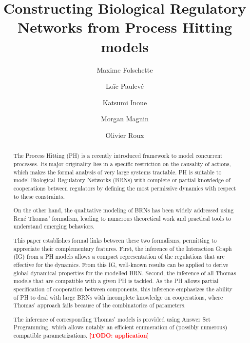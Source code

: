 \documentclass[preprint]{elsarticle}
\newcommand{\rewriteng}[1]{\textcolor{blue}{#1}}
\newcommand{\rewriteil}[1]{\rewriteng{\textbf{[#1]}}}
\newcommand{\todo}[1]{\textcolor{red}{\textbf{[TODO: #1]}}}
\begin{document}
\begin{frontmatter}

\title{Constructing Biological Regulatory Networks from Process Hitting models}

\author[irccyn,nii]{Maxime Folschette}
\author[eth]{Lo\"ic Paulev\'e}
\author[nii]{Katsumi Inoue}
\author[irccyn,nii]{Morgan Magnin}
\author[irccyn]{Olivier Roux}

\address[irccyn]{LUNAM Universit\'e, \'Ecole Centrale de Nantes, IRCCyN UMR CNRS 6597\\
(Institut de Recherche en Communications et Cybern\'etique de Nantes)\\
1 rue de la No\"e - B.P. 92101 - 44321 Nantes Cedex 3, France.}
\address[nii]{National Institute of Informatics,\\
2-1-2, Hitotsubashi, Chiyoda-ku, Tokyo 101-8430, Japan.}
\address[eth]{BISON group, Automatic Control Laboratory, ETH Zürich\\
Physikstrasse 3, 8092 Zurich, Switzerland.}

\begin{abstract}
\parindent 0.5cm
The Process Hitting (PH) is a recently introduced framework to model concurrent processes.
Its major originality lies in a specific restriction on the causality of actions, which
makes the formal analysis of very large systems tractable.
PH is suitable to model Biological Regulatory Networks (BRNs) with complete or partial
knowledge of cooperations between regulators by defining the most permissive dynamics
with respect to these constraints.

On the other hand, the qualitative modeling of BRNs has been widely addressed using Ren\'e Thomas'
formalism, leading to numerous theoretical work and practical tools to understand emerging behaviors.

This paper establishes formal links between these two formalisms, permitting to appreciate their
complementary features.
First, the inference of the Interaction Graph (IG) from a PH models allows a compact representation of
the regulations that are effective for the dynamics.
From this IG, well-known results can be applied to derive global dynamical properties for the
modelled BRN.
Second, the inference of all Thomas models that are compatible with a given PH is tackled.
As the PH allows partial specification of cooperation between components, this inference
emphasizes the ability of PH to deal with large BRNs with incomplete knowledge on
cooperations, where Thomas' approach fails because of the combinatorics of parameters.

The inference of corresponding Thomas' models is provided using Answer Set Programming,
which allows notably an efficient enumeration of (possibly numerous) compatible parametrizations.
\todo{application}
\end{abstract}

\end{frontmatter}
\end{document}
